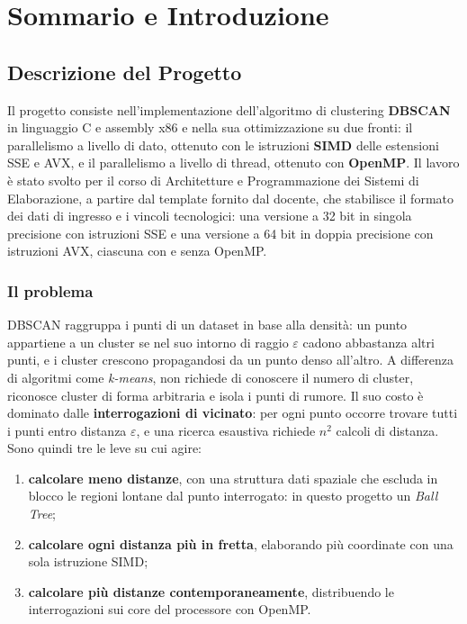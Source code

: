 \chapter{Sommario e Introduzione}

\section{Descrizione del Progetto}

Il progetto consiste nell'implementazione dell'algoritmo di clustering \textbf{DBSCAN}~\cite{ester1996} in linguaggio C e assembly x86 e nella sua ottimizzazione su due fronti: il parallelismo a livello di dato, ottenuto con le istruzioni \textbf{SIMD} delle estensioni SSE e AVX, e il parallelismo a livello di thread, ottenuto con \textbf{OpenMP}. Il lavoro è stato svolto per il corso di Architetture e Programmazione dei Sistemi di Elaborazione, a partire dal template fornito dal docente, che stabilisce il formato dei dati di ingresso e i vincoli tecnologici: una versione a 32 bit in singola precisione con istruzioni SSE e una versione a 64 bit in doppia precisione con istruzioni AVX, ciascuna con e senza OpenMP.

\subsection*{Il problema}

DBSCAN raggruppa i punti di un dataset in base alla densità: un punto appartiene a un cluster se nel suo intorno di raggio $\varepsilon$ cadono abbastanza altri punti, e i cluster crescono propagandosi da un punto denso all'altro. A differenza di algoritmi come \emph{k-means}, non richiede di conoscere il numero di cluster, riconosce cluster di forma arbitraria e isola i punti di rumore. Il suo costo è dominato dalle \textbf{interrogazioni di vicinato}: per ogni punto occorre trovare tutti i punti entro distanza $\varepsilon$, e una ricerca esaustiva richiede $n^2$ calcoli di distanza. Sono quindi tre le leve su cui agire:

\begin{enumerate}
    \item \textbf{calcolare meno distanze}, con una struttura dati spaziale che escluda in blocco le regioni lontane dal punto interrogato: in questo progetto un \emph{Ball Tree};
    \item \textbf{calcolare ogni distanza più in fretta}, elaborando più coordinate con una sola istruzione SIMD;
    \item \textbf{calcolare più distanze contemporaneamente}, distribuendo le interrogazioni sui core del processore con OpenMP.
\end{enumerate}

